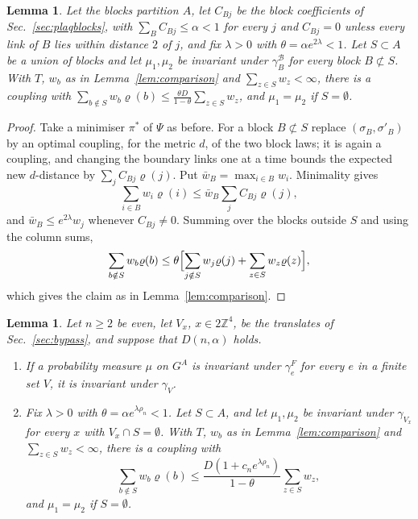 \documentclass[aps,prd,twocolumn,superscriptaddress,nofootinbib,longbibliography,floatfix,amsmath,amssymb,10pt]{revtex4-2}
\newtheorem{lemma}[theorem]{Lemma}
\theoremstyle{definition}
\theoremstyle{remark}
\newcommand{\Z}{\mathbb{Z}}
\begin{document}
\begin{lemma}\label{lem:blockcomparison}
Let the blocks partition $A$, let $C_{Bj}$ be the block coefficients of
Sec.~\ref{sec:plaqblocks}, with $\sum_BC_{Bj}\le\alpha<1$ for every $j$ and
$C_{Bj}=0$ unless every link of $B$ lies within distance $2$ of $j$, and fix
$\lambda>0$ with $\theta=\alpha e^{2\lambda}<1$. Let $S\subset A$ be a union
of blocks and let $\mu_1,\mu_2$ be invariant under $\gamma^{\mathcal B}_B$ for
every block $B\not\subset S$. With $T$, $w_b$ as in
Lemma~\ref{lem:comparison} and $\sum_{z\in S}w_z<\infty$, there is a coupling
with $\sum_{b\notin S}w_b\varrho(b)\le\frac{\theta D}{1-\theta}\sum_{z\in S}w_z$,
and $\mu_1=\mu_2$ if $S=\emptyset$.
\end{lemma}

\begin{proof}
Take a minimiser $\pi^*$ of $\Psi$ as before. For a block $B\not\subset S$
replace $(\sigma_B,\sigma'_B)$ by an optimal coupling, for the metric $d$, of
the two block laws; it is again a coupling, and changing the boundary links
one at a time bounds the expected new $d$-distance by $\sum_jC_{Bj}\varrho(j)$.
Put $\bar w_B=\max_{i\in B}w_i$. Minimality gives
\[
\sum_{i\in B}w_i\varrho(i)\le\bar w_B\sum_jC_{Bj}\varrho(j),
\]
and $\bar w_B\le e^{2\lambda}w_j$ whenever $C_{Bj}\ne0$. Summing over the
blocks outside $S$ and using the column sums,
\[
\sum_{b\notin S}w_b\varrho(b)\le\theta\Bigl[\sum_{j\notin S}w_j\varrho(j)+
\sum_{z\in S}w_z\varrho(z)\Bigr],
\]
which gives the claim as in Lemma~\ref{lem:comparison}.
\end{proof}

\begin{lemma}\label{lem:dscomparison}
Let $n\ge2$ be even, let $V_x$, $x\in2\Z^4$, be the translates of
Sec.~\ref{sec:bypass}, and suppose that $D(n,\alpha)$ holds.
\begin{enumerate}[label=\textup{(\alph*)},leftmargin=*]
\item If a probability measure $\mu$ on $G^A$ is invariant under
$\gamma^F_e$ for every $e$ in a finite set $V$, it is invariant under
$\gamma_V$.
\item Fix $\lambda>0$ with $\theta=\alpha e^{\lambda\rho_n}<1$. Let $S\subset
A$, and let $\mu_1,\mu_2$ be invariant under $\gamma_{V_x}$ for every $x$
with $V_x\cap S=\emptyset$. With $T$, $w_b$ as in Lemma~\ref{lem:comparison}
and $\sum_{z\in S}w_z<\infty$, there is a coupling with
\[
\sum_{b\notin S}w_b\varrho(b)\le\frac{D(1+c_ne^{\lambda\rho_n})}{1-\theta}
\sum_{z\in S}w_z ,
\]
and $\mu_1=\mu_2$ if $S=\emptyset$.
\end{enumerate}
\end{lemma}
\end{document}
